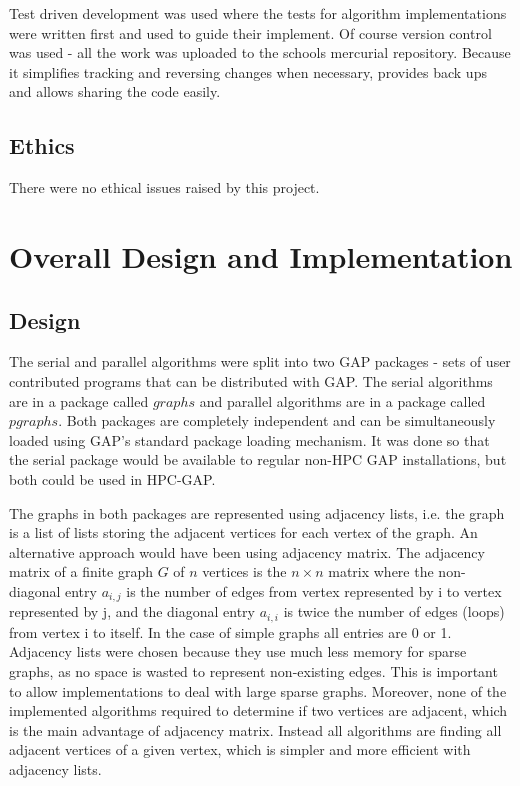 \documentclass{report}
\theoremstyle{plain}
\theoremstyle{definition}
\theoremstyle{remark}
\begin{document}
Test driven development was used where the tests for algorithm implementations were written first and used to guide their implement. Of course version control was used - all the work was uploaded to the schools mercurial repository. Because it simplifies tracking and reversing changes when necessary, provides back ups and allows sharing the code easily.

\section{Ethics}

There were no ethical issues raised by this project.

\chapter{Overall Design and Implementation}

\section{Design}

The serial and parallel algorithms were split into two GAP packages - sets of user contributed programs that can be distributed with GAP. The serial algorithms are in a package called $graphs$ and parallel algorithms are in a package called $pgraphs$. Both packages are completely independent and can be simultaneously loaded using GAP's standard package loading mechanism. It was done so that the serial package would be available to regular non-HPC GAP installations, but both could be used in HPC-GAP.

The graphs in both packages are represented using adjacency lists, i.e. the graph is a list of lists storing the adjacent vertices for each vertex of the graph. An alternative approach would have been using adjacency matrix. The adjacency matrix of a finite graph $G$ of $n$ vertices is the $n\times n$ matrix where the non-diagonal entry $a_{i,j}$ is the number of edges from vertex represented by i to vertex represented by j, and the diagonal entry $a_{i,i}$ is twice the number of edges (loops) from vertex i to itself. In the case of simple graphs all entries are 0 or 1. Adjacency lists were chosen because they use much less memory for sparse graphs,  as no space is wasted to represent non-existing edges. This is important to allow implementations to deal with large sparse graphs. Moreover, none of the implemented algorithms required to determine if two vertices are adjacent, which is the main advantage of adjacency matrix. Instead all algorithms are finding all adjacent vertices of a given vertex, which is simpler and more efficient with adjacency lists.
\end{document}
